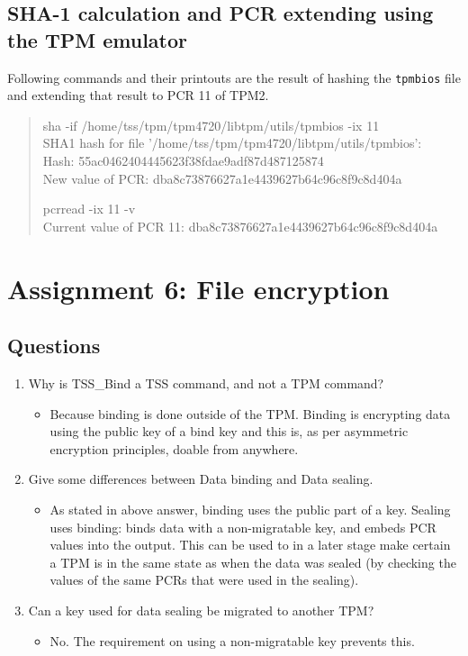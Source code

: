 \documentclass[10pt]{article}
\begin{document}
\subsection{SHA-1 calculation and PCR extending using the TPM emulator}
Following commands and their printouts are the result of hashing the
\texttt{tpmbios} file and extending that result to PCR 11 of TPM2.
\begin{quote}
sha -if /home/tss/tpm/tpm4720/libtpm/utils/tpmbios -ix 11\\
SHA1 hash for file '/home/tss/tpm/tpm4720/libtpm/utils/tpmbios': \\
Hash: 55ac0462404445623f38fdae9adf87d487125874\\
New value of PCR: dba8c73876627a1e4439627b64c96c8f9c8d404a

pcrread -ix 11 -v \\
Current value of PCR 11: dba8c73876627a1e4439627b64c96c8f9c8d404a
\end{quote}

\section{Assignment 6: File encryption}
\subsection{Questions}
\begin{enumerate}
    \item {Why is TSS\_Bind a TSS command, and not a TPM command?}
    \begin{itemize}
        \item {Because binding is done outside of the TPM. Binding is encrypting
        data using the public key of a bind key and this is, as per
        asymmetric encryption principles, doable from anywhere.}
    \end{itemize}
    \item {Give some differences between Data binding and Data sealing.}
    \begin{itemize}
        \item {As stated in above answer, binding uses the public part of a key.
        Sealing uses binding: binds data with a non-migratable key, and embeds PCR
         values into
        the output. This can be used to in a later stage make certain a TPM is in
         the same state as when the
        data was sealed (by checking the values of the same PCRs that were used
        in the sealing).}
    \end{itemize}
    \item {Can a key used for data sealing be migrated to another TPM?}
    \begin{itemize}
        \item {No. The requirement on using a non-migratable key prevents this.}
    \end{itemize}
\end{enumerate}
\end{document}
